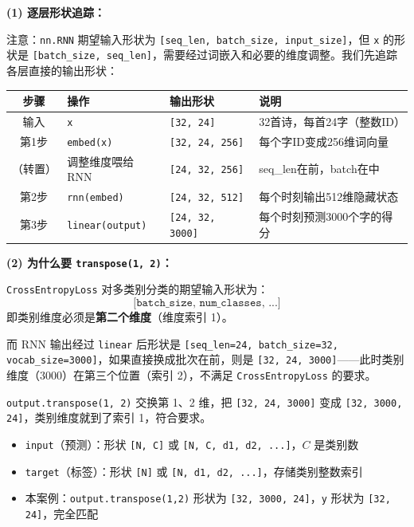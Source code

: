 \documentclass[a4paper,11pt]{ctexart}
\begin{document}
\begin{solutionbox}[参考答案与详细解析]
    \textbf{(1) 逐层形状追踪：}

    注意：\texttt{nn.RNN} 期望输入形状为 \texttt{[seq\_len, batch\_size, input\_size]}，但 \texttt{x} 的形状是 \texttt{[batch\_size, seq\_len]}，需要经过词嵌入和必要的维度调整。我们先追踪各层直接的输出形状：

    \begin{center}
    \begin{tabular}{clll}
        \toprule
        步骤 & 操作 & 输出形状 & 说明 \\
        \midrule
        输入 & \texttt{x} & \texttt{[32, 24]} & 32首诗，每首24字（整数ID） \\
        第1步 & \texttt{embed(x)} & \texttt{[32, 24, 256]} & 每个字ID变成256维词向量 \\
        （转置） & 调整维度喂给RNN & \texttt{[24, 32, 256]} & seq\_len在前，batch在中 \\
        第2步 & \texttt{rnn(embed)} & \texttt{[24, 32, 512]} & 每个时刻输出512维隐藏状态 \\
        第3步 & \texttt{linear(output)} & \texttt{[24, 32, 3000]} & 每个时刻预测3000个字的得分 \\
        \bottomrule
    \end{tabular}
    \end{center}

    \textbf{(2) 为什么要 \texttt{transpose(1, 2)}：}

    \texttt{CrossEntropyLoss} 对多类别分类的期望输入形状为：
    \[
    \texttt{[batch\_size, num\_classes, ...]}
    \]
    即类别维度必须是\textbf{第二个维度}（维度索引 1）。

    而 RNN 输出经过 \texttt{linear} 后形状是 \texttt{[seq\_len=24, batch\_size=32, vocab\_size=3000]}，如果直接换成批次在前，则是 \texttt{[32, 24, 3000]}——此时类别维度（3000）在第三个位置（索引 2），不满足 \texttt{CrossEntropyLoss} 的要求。

    \texttt{output.transpose(1, 2)} 交换第 1、2 维，把 \texttt{[32, 24, 3000]} 变成 \texttt{[32, 3000, 24]}，类别维度就到了索引 1，符合要求。

    \begin{keybox}
        \begin{itemize}
            \item \texttt{input}（预测）：形状 \texttt{[N, C]} 或 \texttt{[N, C, d1, d2, ...]}，$C$ 是类别数
            \item \texttt{target}（标签）：形状 \texttt{[N]} 或 \texttt{[N, d1, d2, ...]}，存储类别整数索引
            \item 本案例：\texttt{output.transpose(1,2)} 形状为 \texttt{[32, 3000, 24]}，\texttt{y} 形状为 \texttt{[32, 24]}，完全匹配
        \end{itemize}
    \end{keybox}


\end{solutionbox}
\end{document}
